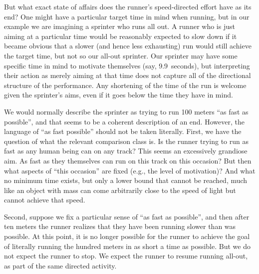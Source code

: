 But what exact state of affairs does the runner's speed-directed effort have as its end? One might have a particular target time in mind when running, but in our example we are imagining a sprinter who runs all out. A runner who is just aiming at a particular time would be reasonably expected to slow down if it became obvious
that a slower (and hence less exhausting) run would still achieve the target time, but not so our all-out sprinter. Our sprinter may have some specific time in mind
to motivate themselves (say, 9.9~seconds), but interpreting their action as merely aiming at that time does not capture all of the directional structure 
of the performance. Any shortening of the time of the run is welcome given the sprinter's aims, even if it goes
below the time they have in mind.

We would normally describe the sprinter as trying to run 100 meters ``as fast as possible'', and that seems to be a coherent description
of an end. However, the language of ``as fast possible'' should not be taken literally. First, we have the question of what the relevant
comparison class is. Is the runner trying to run as fast as any human being can on any track? This seems an excessively
grandiose aim. As fast as they themselves can run on this track on this occasion? But then what aspects of ``this occasion'' are 
fixed (e.g., the level of motivation)? And what no minimum time exists, but only a lower bound that cannot be reached, much like
an object with mass can come arbitrarily close to the speed of light but cannot achieve that speed.

Second, suppose we fix a particular sense of ``as fast as possible'', and then after ten meters the runner realizes that they have
been running slower than was possible. At this point, it is no longer possible for the runner to achieve the goal of literally running
the hundred meters in as short a time as possible. But we do not expect the runner to stop. We expect the runner to resume running all-out, as part of the
same directed activity.

